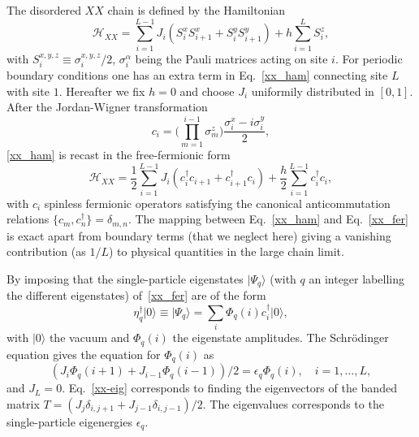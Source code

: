 \documentclass[twocolumn,superscriptaddress,prb,10pt]{revtex4-1}
\begin{document}
The disordered $XX$ chain is defined by the Hamiltonian 
%
\begin{equation}
{\mathcal H}_{XX}=\sum\limits_{i=1}^{L-1}J_i(S^x_iS^x_{i+1}+S^y_i
S^y_{i+1})+h\sum\limits_{i=1}^{L}S_i^z, 
\label{xx_ham}
\end{equation}
%
with $S^{x,y,z}_i\equiv\sigma_i^{x,y,z}/2$, $\sigma_i^\alpha$ 
being the Pauli matrices acting on site $i$. For periodic 
boundary conditions one has an extra term in Eq.~\eqref{xx_ham} 
connecting site $L$ with site $1$. Hereafter we fix $h=0$ and 
choose $J_i$ uniformily distributed in $[0,1]$. After the Jordan-Wigner 
transformation 
%
\begin{equation}
c_i=\Big(\prod\limits_{m=1}^{i-1}\sigma^z_m\Big)
\frac{\sigma_i^x-i\sigma_i^y}{2},
\label{j-wigner}
\end{equation}
%
\eqref{xx_ham} is recast in the free-fermionic form 
%
\begin{equation}
{\mathcal H}_{XX}=\frac{1}{2}\sum\limits_{i=1}^{L-1}J_i(c^\dagger_i 
c_{i+1}+c^\dagger_{i+1}c_i)+\frac{h}{2}\sum\limits_{i=1}^{L-1}
c^\dagger_i c_i,
\label{xx_fer}
\end{equation}
%
with $c_i$ spinless fermionic operators satisfying the canonical 
anticommutation relations $\{c_m,c^\dagger_n\}=\delta_{m,n}$. 
The mapping between Eq.~\eqref{xx_ham} and Eq.~\eqref{xx_fer} 
is exact apart from boundary terms (that we neglect here) giving a 
vanishing contribution (as $1/L$) to physical quantities in the  large 
chain limit. 

By imposing that the single-particle eigenstates $|\Psi_q\rangle$ (with $q$ 
an integer labelling the different eigenstates) of~\eqref{xx_fer} are of 
the form 
%
\begin{equation}
\eta_q^\dagger|0\rangle\equiv|\Psi_q\rangle=\sum_i\Phi_q(i)c_i^\dagger|0\rangle,
\end{equation}
%
with $|0\rangle$ the vacuum and $\Phi_q(i)$ the eigenstate amplitudes. 
The Schr\"odinger equation gives the equation for $\Phi_q(i)$ as 
%
\begin{equation}
\label{xx-eig}
(J_i\Phi_q(i+1)+J_{i-1}\Phi_q(i-1))/2=\epsilon_q\Phi_q(i),\quad i=1,\dots,L, 
\end{equation}
%
and $J_L=0$. Eq.~\eqref{xx-eig} corresponds to finding the eigenvectors 
of the banded matrix $T=(J_j\delta_{i,j+1}+J_{j-1}\delta_{i,j-1})/2$. The eigenvalues 
corresponds to the single-particle eigenergies $\epsilon_q$. 
\end{document}
